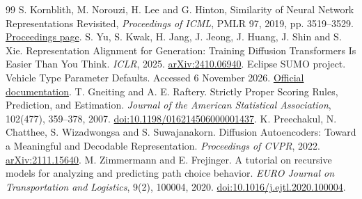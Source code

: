 \begin{thebibliography}{99}
 S. Kornblith, M. Norouzi, H. Lee and G. Hinton, Similarity of Neural Network Representations Revisited, \emph{Proceedings of ICML}, PMLR 97, 2019, pp. 3519--3529. \href{https://proceedings.mlr.press/v97/kornblith19a.html}{Proceedings page}.
 S. Yu, S. Kwak, H. Jang, J. Jeong, J. Huang, J. Shin and S. Xie. Representation Alignment for Generation: Training Diffusion Transformers Is Easier Than You Think. \emph{ICLR}, 2025. \href{https://arxiv.org/abs/2410.06940}{arXiv:2410.06940}.
 Eclipse SUMO project. Vehicle Type Parameter Defaults. Accessed 6 November 2026. \href{https://sumo.dlr.de/docs/Vehicle_Type_Parameter_Defaults.html}{Official documentation}.
 T. Gneiting and A. E. Raftery. Strictly Proper Scoring Rules, Prediction, and Estimation. \emph{Journal of the American Statistical Association}, 102(477), 359--378, 2007. \href{https://doi.org/10.1198/016214506000001437}{doi:10.1198/016214506000001437}.
 K. Preechakul, N. Chatthee, S. Wizadwongsa and S. Suwajanakorn. Diffusion Autoencoders: Toward a Meaningful and Decodable Representation. \emph{Proceedings of CVPR}, 2022. \href{https://arxiv.org/abs/2111.15640}{arXiv:2111.15640}.
 M. Zimmermann and E. Frejinger. A tutorial on recursive models for analyzing and predicting path choice behavior. \emph{EURO Journal on Transportation and Logistics}, 9(2), 100004, 2020. \href{https://doi.org/10.1016/j.ejtl.2020.100004}{doi:10.1016/j.ejtl.2020.100004}.
\end{thebibliography}
